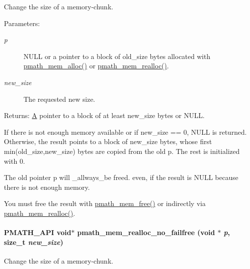 Change the size of a memory-chunk. 

\begin{Desc}
\item[Parameters:]
\begin{description}
\item[{\em p}]NULL or a pointer to a block of old\_\-size bytes allocated with \hyperlink{group__memory_g856c326c830629de5637912fa8bc2bc9}{pmath\_\-mem\_\-alloc()} or \hyperlink{group__memory_g59dc67a7de0dc3111dfb0424df8d8244}{pmath\_\-mem\_\-realloc()}. \item[{\em new\_\-size}]The requested new size. \end{description}
\end{Desc}
\begin{Desc}
\item[Returns:]\hyperlink{class_a}{A} pointer to a block of at least new\_\-size bytes or NULL.\end{Desc}
If there is not enough memory available or if new\_\-size == 0, NULL is returned. Otherwise, the result points to a block of new\_\-size bytes, whose first min(old\_\-size,new\_\-size) bytes are copied from the old p. The rest is initialized with 0.

The old pointer p will \_\-allways\_\-be freed. even, if the result is NULL because there is not enough memory.

You must free the result with \hyperlink{group__memory_g936d3001151c35052812e597eb7dce4f}{pmath\_\-mem\_\-free()} or indirectly via \hyperlink{group__memory_g59dc67a7de0dc3111dfb0424df8d8244}{pmath\_\-mem\_\-realloc()}. \hypertarget{group__memory_g212c329fa5e691842e46580bd94f6e4c}{
\paragraph[{pmath\_\-mem\_\-realloc\_\-no\_\-failfree}]{\setlength{\rightskip}{0pt plus 5cm}PMATH\_\-API void$\ast$ pmath\_\-mem\_\-realloc\_\-no\_\-failfree (void $\ast$ {\em p}, \/  size\_\-t {\em new\_\-size})}\hfill}
\label{group__memory_g212c329fa5e691842e46580bd94f6e4c}


Change the size of a memory-chunk. 

